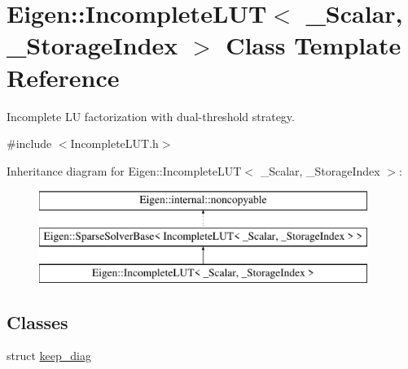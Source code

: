 \hypertarget{class_eigen_1_1_incomplete_l_u_t}{}\section{Eigen\+::Incomplete\+L\+UT$<$ \+\_\+\+Scalar, \+\_\+\+Storage\+Index $>$ Class Template Reference}
\label{class_eigen_1_1_incomplete_l_u_t}


Incomplete LU factorization with dual-\/threshold strategy.  




{\ttfamily \#include $<$Incomplete\+L\+U\+T.\+h$>$}

Inheritance diagram for Eigen\+::Incomplete\+L\+UT$<$ \+\_\+\+Scalar, \+\_\+\+Storage\+Index $>$\+:\begin{figure}[H]
\begin{center}
\leavevmode
\includegraphics[height=3.000000cm]{class_eigen_1_1_incomplete_l_u_t}
\end{center}
\end{figure}
\subsection*{Classes}
\begin{DoxyCompactItemize}
\item 
struct \mbox{\hyperlink{struct_eigen_1_1_incomplete_l_u_t_1_1keep__diag}{keep\+\_\+diag}}
\end{DoxyCompactItemize}

